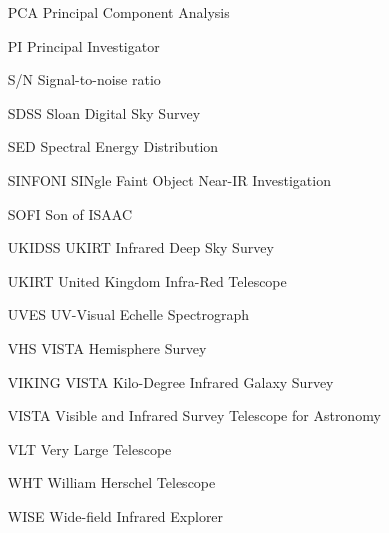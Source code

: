\begin{itemize}
      \item[PCA]{Principal Component Analysis}
      \item[PI]{Principal Investigator}
      \item[S/N]{Signal-to-noise ratio}
      \item[SDSS]{Sloan Digital Sky Survey}
      \item[SED]{Spectral Energy Distribution}
      \item[SINFONI]{SINgle Faint Object Near-IR Investigation}
      \item[SOFI]{Son of ISAAC}
      \item[UKIDSS]{UKIRT Infrared Deep Sky Survey}
      \item[UKIRT]{United Kingdom Infra-Red Telescope}
      \item[UVES]{UV-Visual Echelle Spectrograph}
      \item[VHS]{VISTA Hemisphere Survey}
      \item[VIKING]{VISTA Kilo-Degree Infrared Galaxy Survey}
      \item[VISTA]{Visible and Infrared Survey Telescope for Astronomy}
      \item[VLT]{Very Large Telescope}
      \item[WHT]{William Herschel Telescope}
      \item[WISE]{Wide-field Infrared Explorer}
    \end{itemize}


\endgroup
